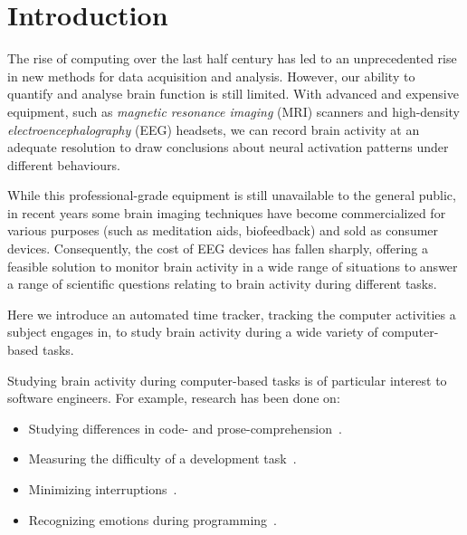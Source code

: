 \chapter{Introduction}




The rise of computing over the last half century has led to an unprecedented rise in new methods for data acquisition and analysis. However, our ability to quantify and analyse brain function is still limited. With advanced and expensive equipment, such as \emph{magnetic resonance imaging} (MRI) scanners and high-density \emph{electroencephalography} (EEG) headsets, we can record brain activity at an adequate resolution to draw conclusions about neural activation patterns under different behaviours.

While this professional-grade equipment is still unavailable to the general public, in recent years some brain imaging techniques have become commercialized for various purposes (such as meditation aids, biofeedback) and sold as consumer devices. Consequently, the cost of EEG devices has fallen sharply, offering a feasible solution to monitor brain activity in a wide range of situations to answer a range of scientific questions relating to brain activity during different tasks.


Here we introduce an automated time tracker, tracking the computer activities a subject engages in, to study brain activity during a wide variety of computer-based tasks.

\begin{minipage}{\textwidth}

Studying brain activity during computer-based tasks is of particular interest to software engineers. For example, research has been done on:

\begin{itemize}
    \item Studying differences in code- and prose-comprehension~\cite{floyd_decoding_2017}\cite{fucci_replication_2019}.
    \item Measuring the difficulty of a development task~\cite{fritz_using_2014}.
    \item Minimizing interruptions~\cite{zuger_reducing_2017}.
    \item Recognizing emotions during programming~\cite{girardi_recognizing_2020}.
\end{itemize}

\end{minipage}

